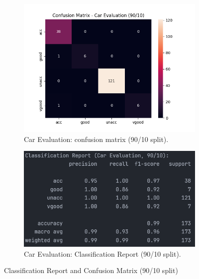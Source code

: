 \begin{figure}[H]
	\centering
	\begin{subfigure}{0.45\textwidth}
		\centering
		\includegraphics[width=\textwidth]{imgs/confusion_mat/confusion_mat__car_evaluation__90_vs_10.png}
		\caption{Car Evaluation: confusion matrix (90/10 split).}\label{fig:ce-cm-90-10}
	\end{subfigure}
	\hfill
	\begin{subfigure}{0.45\textwidth}
		\centering
		\includegraphics[width=\textwidth]{imgs/confusion_mat/class_rp__car_evaluation__90_vs_10.png}
		\caption{Car Evaluation: Classification Report (90/10 split).}\label{fig:ce-cr-90-10}
	\end{subfigure}

	\caption{Classification Report and Confusion Matrix (90/10 split)}\label{fig:ce-eval-90-10}
\end{figure}

